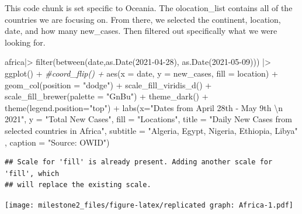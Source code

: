 \documentclass[
]{article}
\newenvironment{Shaded}{\begin{snugshade}}{\end{snugshade}}
\newcommand{\AttributeTok}[1]{\textcolor[rgb]{0.77,0.63,0.00}{#1}}
\newcommand{\CommentTok}[1]{\textcolor[rgb]{0.56,0.35,0.01}{\textit{#1}}}
\newcommand{\FunctionTok}[1]{\textcolor[rgb]{0.00,0.00,0.00}{#1}}
\newcommand{\NormalTok}[1]{#1}
\newcommand{\SpecialCharTok}[1]{\textcolor[rgb]{0.00,0.00,0.00}{#1}}
\newcommand{\StringTok}[1]{\textcolor[rgb]{0.31,0.60,0.02}{#1}}
\begin{document}
This code chunk is set specific to Oceania. The olocation\_list contains
all of the countries we are focusing on. From there, we selected the
continent, location, date, and how many new\_cases. Then filtered out
specifically what we were looking for.

\begin{Shaded}
\begin{Highlighting}[]
\NormalTok{africa}\SpecialCharTok{|\textgreater{}}
  \FunctionTok{filter}\NormalTok{(}\FunctionTok{between}\NormalTok{(date,}\FunctionTok{as.Date}\NormalTok{(}\StringTok{\textquotesingle{}2021{-}04{-}28\textquotesingle{}}\NormalTok{), }\FunctionTok{as.Date}\NormalTok{(}\StringTok{\textquotesingle{}2021{-}05{-}09\textquotesingle{}}\NormalTok{))) }\SpecialCharTok{|\textgreater{}}
  \FunctionTok{ggplot}\NormalTok{() }\SpecialCharTok{+}
  \CommentTok{\#coord\_flip() +}
  \FunctionTok{aes}\NormalTok{(}\AttributeTok{x =}\NormalTok{ date, }\AttributeTok{y =}\NormalTok{ new\_cases, }\AttributeTok{fill =}\NormalTok{ location) }\SpecialCharTok{+}
  \FunctionTok{geom\_col}\NormalTok{(}\AttributeTok{position =} \StringTok{"dodge"}\NormalTok{) }\SpecialCharTok{+}
  \FunctionTok{scale\_fill\_viridis\_d}\NormalTok{() }\SpecialCharTok{+}
  \FunctionTok{scale\_fill\_brewer}\NormalTok{(}\AttributeTok{palette =} \StringTok{"GnBu"}\NormalTok{) }\SpecialCharTok{+}
  \FunctionTok{theme\_dark}\NormalTok{() }\SpecialCharTok{+}
  \FunctionTok{theme}\NormalTok{(}\AttributeTok{legend.position=}\StringTok{"top"}\NormalTok{) }\SpecialCharTok{+}
   \FunctionTok{labs}\NormalTok{(}\AttributeTok{x=}\StringTok{"Dates from April 28th {-} May 9th }\SpecialCharTok{\textbackslash{}n}\StringTok{ 2021"}\NormalTok{,}
       \AttributeTok{y =} \StringTok{"Total New Cases"}\NormalTok{,}
       \AttributeTok{fill =} \StringTok{"Locations"}\NormalTok{,}
       \AttributeTok{title =} \StringTok{"Daily New Cases from selected countries in Africa"}\NormalTok{,}
       \AttributeTok{subtitle =} \StringTok{"Algeria, Egypt, Nigeria, Ethiopia, Libya"}\NormalTok{ ,}
       \AttributeTok{caption =} \StringTok{"Source: OWID"}\NormalTok{)}
\end{Highlighting}
\end{Shaded}

\begin{verbatim}
## Scale for 'fill' is already present. Adding another scale for 'fill', which
## will replace the existing scale.
\end{verbatim}

\texttt{[image: milestone2\_files/figure-latex/replicated graph: Africa-1.pdf]}
\end{document}
